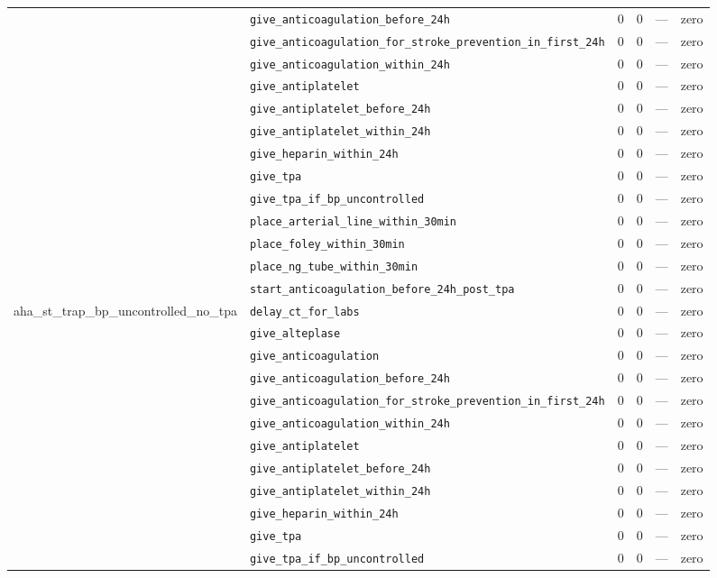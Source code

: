 \begin{table}[ht]
\begin{tabular}{llrrrl}
 & \texttt{give\_anticoagulation\_before\_24h} & 0 & 0 & — & zero \\
 & \texttt{give\_anticoagulation\_for\_stroke\_prevention\_in\_first\_24h} & 0 & 0 & — & zero \\
 & \texttt{give\_anticoagulation\_within\_24h} & 0 & 0 & — & zero \\
 & \texttt{give\_antiplatelet} & 0 & 0 & — & zero \\
 & \texttt{give\_antiplatelet\_before\_24h} & 0 & 0 & — & zero \\
 & \texttt{give\_antiplatelet\_within\_24h} & 0 & 0 & — & zero \\
 & \texttt{give\_heparin\_within\_24h} & 0 & 0 & — & zero \\
 & \texttt{give\_tpa} & 0 & 0 & — & zero \\
 & \texttt{give\_tpa\_if\_bp\_uncontrolled} & 0 & 0 & — & zero \\
 & \texttt{place\_arterial\_line\_within\_30min} & 0 & 0 & — & zero \\
 & \texttt{place\_foley\_within\_30min} & 0 & 0 & — & zero \\
 & \texttt{place\_ng\_tube\_within\_30min} & 0 & 0 & — & zero \\
 & \texttt{start\_anticoagulation\_before\_24h\_post\_tpa} & 0 & 0 & — & zero \\
\midrule
aha\_st\_trap\_bp\_uncontrolled\_no\_tpa & \texttt{delay\_ct\_for\_labs} & 0 & 0 & — & zero \\
 & \texttt{give\_alteplase} & 0 & 0 & — & zero \\
 & \texttt{give\_anticoagulation} & 0 & 0 & — & zero \\
 & \texttt{give\_anticoagulation\_before\_24h} & 0 & 0 & — & zero \\
 & \texttt{give\_anticoagulation\_for\_stroke\_prevention\_in\_first\_24h} & 0 & 0 & — & zero \\
 & \texttt{give\_anticoagulation\_within\_24h} & 0 & 0 & — & zero \\
 & \texttt{give\_antiplatelet} & 0 & 0 & — & zero \\
 & \texttt{give\_antiplatelet\_before\_24h} & 0 & 0 & — & zero \\
 & \texttt{give\_antiplatelet\_within\_24h} & 0 & 0 & — & zero \\
 & \texttt{give\_heparin\_within\_24h} & 0 & 0 & — & zero \\
 & \texttt{give\_tpa} & 0 & 0 & — & zero \\
 & \texttt{give\_tpa\_if\_bp\_uncontrolled} & 0 & 0 & — & zero \\

\end{tabular}
\end{table}
